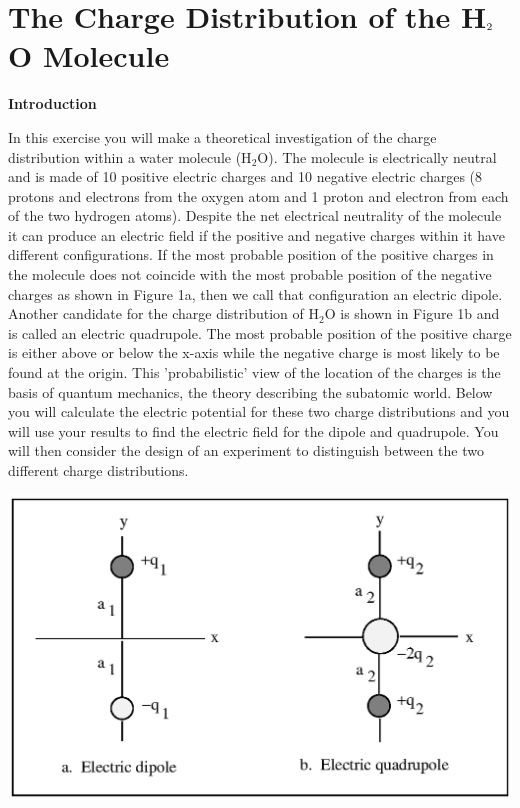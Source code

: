 
\section{The Charge Distribution of the H\protect\( _{2}\protect \)O Molecule}

\makelabheader %

\textbf{Introduction}

In this exercise you will make a theoretical investigation of the
charge distribution within a water molecule (H$_2$O). The molecule
is electrically neutral and is made of 10 positive electric charges
and 10 negative electric charges (8 protons and electrons from the
oxygen atom and 1 proton and electron from each of the two hydrogen
atoms). Despite the net electrical neutrality of the molecule it can
produce an electric field if the positive and negative charges within
it have different configurations. If the most probable position of
the positive charges in the molecule does not coincide with the most
probable position of the negative charges as shown in Figure 1a, then
we call that configuration an electric dipole. Another candidate for
the charge distribution of H$_2$O is shown in Figure 1b and
is called an electric quadrupole. The most probable position of the
positive charge is either above or below the x-axis while the negative
charge is most likely to be found at the origin. This 'probabilistic'
view of the location of the charges is the basis of quantum mechanics,
the theory describing the subatomic world. Below you will calculate
the electric potential for these two charge distributions and you
will use your results to find the electric field for the dipole and
quadrupole. You will then consider the design of an experiment to
distinguish between the two different charge distributions.

\vspace{0.3cm}
{\centering \includegraphics{charge_dist_water_mol/charge_dist_water_mol_fig_1.eps} \par}
\vspace{0.3cm}

